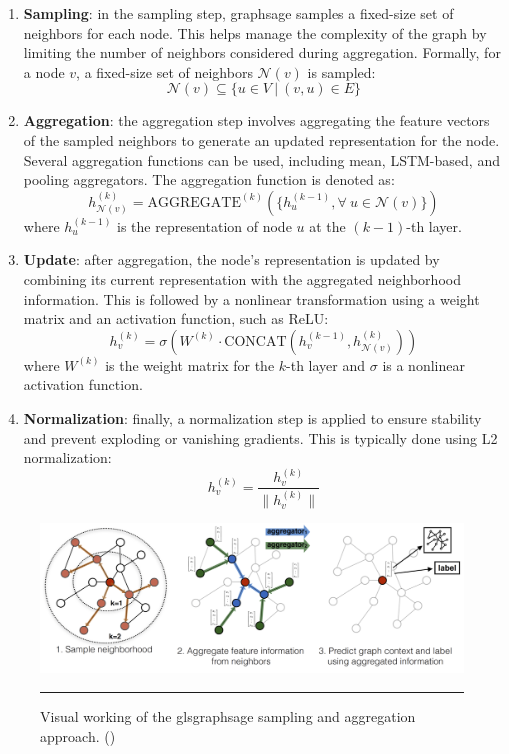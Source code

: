 \begin{enumerate}
    \item \textbf{Sampling}: in the sampling step, \gls{graphsage} samples a fixed-size set of neighbors for each node. This helps manage the complexity of the graph by limiting the number of neighbors considered during aggregation. Formally, for a node \(v\), a fixed-size set of neighbors \(\mathcal{N}(v)\) is sampled:
    \[
    \mathcal{N}(v) \subseteq \{u \in V~|~(v, u) \in E\}
    \]
 
    \item \textbf{Aggregation}: the aggregation step involves aggregating the feature vectors of the sampled neighbors to generate an updated representation for the node. Several aggregation functions can be used, including mean, LSTM-based, and pooling aggregators. The aggregation function is denoted as:
    \[
    h_{\mathcal{N}(v)}^{(k)} = \text{AGGREGATE}^{(k)}(\{h_u^{(k-1)}, \forall~u \in \mathcal{N}(v)\})
    \]
    where \(h_u^{(k-1)}\) is the representation of node \(u\) at the \((k-1)\)-th layer.
 
    \item \textbf{Update}: after aggregation, the node's representation is updated by combining its current representation with the aggregated neighborhood information. This is followed by a nonlinear transformation using a weight matrix and an activation function, such as ReLU:
    \[
    h_v^{(k)} = \sigma\left(W^{(k)} \cdot \text{CONCAT}(h_v^{(k-1)}, h_{\mathcal{N}(v)}^{(k)})\right)
    \]
    where \(W^{(k)}\) is the weight matrix for the \(k\)-th layer and \(\sigma\) is a nonlinear activation function.
 
    \item \textbf{Normalization}: finally, a normalization step is applied to ensure stability and prevent exploding or vanishing gradients. This is typically done using L2 normalization:
    \[
    h_v^{(k)} = \frac{h_v^{(k)}}{\|h_v^{(k)}\|}
    \]
\end{enumerate}

\begin{figure}[htbp]
    \centering
 \includegraphics[width=.9\textwidth]{03_Figures/literature-review/graphsage-approach.png}
     \rule{35em}{0.5pt}
    \caption{Visual working of the gls{graphsage} sampling and aggregation approach. (\cite{Hamilton2017})} 
 \label{fig:graphsage-approach}
\end{figure}

